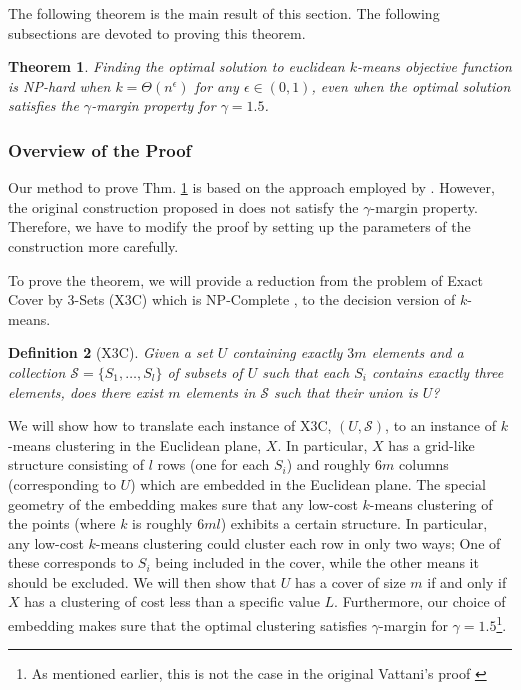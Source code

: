 \documentclass{article}
\newcommand{\mc}{\mathcal}
\newtheorem{theorem}{Theorem}
\newtheorem{definition}[theorem]{Definition}
\begin{document}
The following theorem is the main result of this section. The following subsections are devoted to proving this theorem.

\begin{theorem}
\label{thm:gammaLower}
Finding the optimal solution to euclidean $k$-means objective function is NP-hard when $k=\Theta(n^\epsilon)$ for any $\epsilon \in (0,1)$, even when the optimal solution satisfies the $\gamma$-margin property for $\gamma = 1.5$.
\end{theorem}

\subsubsection{Overview of the Proof}

Our method to prove Thm. \ref{thm:gammaLower} is based on the approach employed by \cite{vattani2009hardness}. However, the original construction proposed in \cite{vattani2009hardness} does not satisfy the $\gamma$-margin property. Therefore, we have to modify the proof by setting up the parameters of the construction more carefully. 

To prove the theorem, we will provide a reduction from the problem of Exact Cover by 3-Sets (X3C) which is NP-Complete \cite{garey2002computers}, to the decision version of $k$-means.

\begin{definition}[X3C]
Given a set $U$ containing exactly $3m$ elements and a collection $\mc S = \{S_1, \ldots, S_l\}$ of subsets of $U$ such that each $S_i$ contains exactly three elements, does there exist $m$ elements in $\mc S$ such that their union is $U$? 
\end{definition}

We will show how to translate each instance of X3C, $(U,\mc S)$, to an instance of $k$-means clustering in the Euclidean plane, $X$. In particular, $X$ has a grid-like structure consisting of $l$ rows (one for each $S_i$) and roughly $6m$ columns (corresponding to $U$) which are embedded in the Euclidean plane. The special geometry of the embedding makes sure that any low-cost $k$-means clustering of the points (where $k$ is roughly $6ml$) exhibits a certain structure. In particular, any low-cost $k$-means clustering could cluster each row in only two ways; One of these corresponds to $S_i$ being included in the cover, while the other means it should be excluded. We will then show that $U$ has a cover of size $m$ if and only if $X$ has a clustering of cost less than a specific value $L$. Furthermore, our choice of embedding makes sure that the optimal clustering satisfies $\gamma$-margin for $\gamma=1.5$\footnote{As mentioned earlier, this is not the case in the original Vattani's proof \cite{vattani2009hardness}}.
\end{document}
